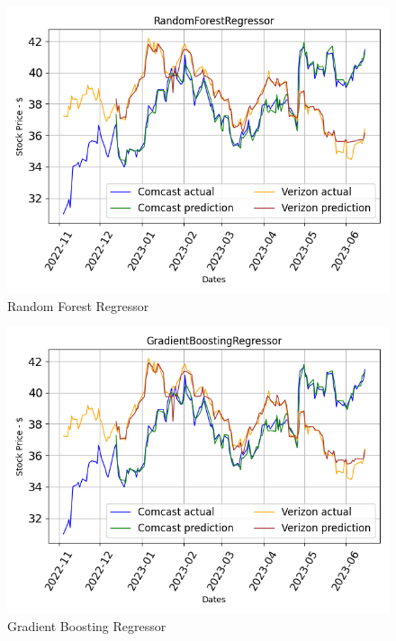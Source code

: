 \documentclass[conference]{IEEEtran}
\begin{document}
\begin{figure}
    \includegraphics[width=\columnwidth]{RandomForestRegressor}
    \caption{Random Forest Regressor}
    \label{fig:rf}
\end{figure}

\begin{figure}
    \includegraphics[width=\columnwidth]{GradientBoostingRegressor}
    \caption{Gradient Boosting Regressor}
    \label{fig:gb}
\end{figure}
\end{document}
